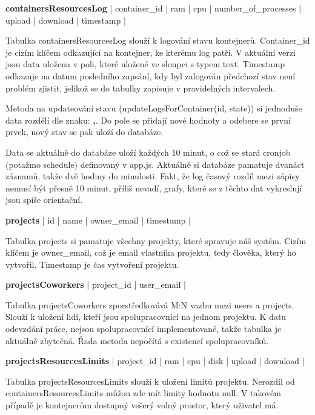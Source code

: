 \documentclass[a4paper,oneside,12pt]{report}
\begin{document}
\vspace{0.3cm}
\noindent
\textbf{containersResourcesLog} | container\_id | ram | cpu | number\_of\_processes | upload | download | timestamp |

Tabulka containersResourcesLog slouží k logování stavu kontejnerů.
Container\_id je cizím klíčem odkazující na kontejner, ke kterému log patří.
V aktuální verzi jsou data uložena v poli, které uložené ve sloupci s typem text.
Timestamp odkazuje na datum posledního zapsání, kdy byl zalogován předchozí stav není problém zjistit, jelikož se do tabulky zapisuje v pravidelných intervalech.

Metoda na updateování stavu (updateLogsForContainer(id, state)) si jednoduše data rozdělí dle znaku: \textbf{,}.
Do pole se přidají nové hodnoty a odebere se první prvek, nový stav se pak uloží do databáze.

Data se aktuálně do databáze uloží každých 10 minut, o což se stará cronjob (potažmo schedule) definovaný v app.js.
Aktuálně si databáze pamatuje dvanáct záznamů, takže dvě hodiny do minulosti.
Fakt, že log časový rozdíl mezi zápisy nemusí být přesně 10 minut, příliš nevadí, grafy, které se z těchto dat vykreslují jsou spíše orientační.


\vspace{0.3cm}
\noindent
\textbf{projects} | id | name | owner\_email | timestamp |

Tabulka projects si pamatuje všechny projekty, které spravuje náš systém.
Cizím klíčem je owner\_email, což je email vlastníka projektu, tedy člověka, který ho vytvořil.
Timestamp je čas vytvoření projektu.

\vspace{0.3cm}
\noindent
\textbf{projectsCoworkers} | project\_id | user\_email |

Tabulka projectsCoworkers zporstředkovává M:N vazbu mezi users a projects.
Slouží k uložení lidí, kteří jsou spolupracovnící na jednom projektu.
K datu odevzdání práce, nejsou spolupracovnící implementované, takže tabulka je aktuálně zbytečná.
Řada metoda nepočítá s existencí spolupracovníků.

\vspace{0.3cm}
\noindent
\textbf{projectsResourcesLimits} | project\_id | ram | cpu | disk | upload | download |

Tabulka projectsResourcesLimits slouží k uložení limitů projektu.
Nerozdíl od containersResourcesLimits můžou zde mít limity hodnotu null.
V takovém případě je kontejnerům dostupný vešerý volný prostor, který uživatel má.
\end{document}
